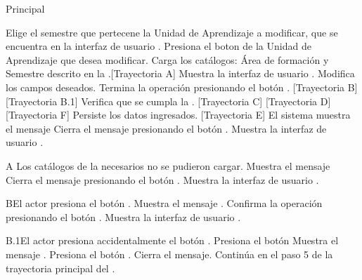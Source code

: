 \begin{UCtrayectoria}{Principal}
	
	\UCpaso[\UCactor] Elige el semestre que pertecene la Unidad de Aprendizaje a modificar, que se encuentra en la interfaz de usuario .
	\UCpaso[\UCactor] Presiona el boton  de la Unidad de Aprendizaje que desea modificar.
	\UCpaso Carga los catálogos: Área de formación y Semestre descrito en la .[Trayectoria A]
	\UCpaso Muestra la interfaz de usuario .
	\UCpaso[\UCactor] Modifica los campos deseados.
	\UCpaso[\UCactor] Termina la operación presionando el botón . [Trayectoria B] [Trayectoria B.1]
	\UCpaso Verifica que se cumpla la . [Trayectoria C] [Trayectoria D] [Trayectoria F]
	\UCpaso Persiste los datos ingresados. [Trayectoria E]
	\UCpaso El sistema muestra el mensaje   
	\UCpaso[\UCactor] Cierra el mensaje presionando el botón .
	\UCpaso Muestra la interfaz de usuario  .

  
\begin{UCtrayectoriaA}{A}{ Los catálogos de la  necesarios no se pudieron cargar.}
	\UCpaso Muestra el mensaje 
	\UCpaso[\UCactor] Cierra el mensaje presionando el botón .
	\UCpaso Muestra la interfaz de usuario .
\end{UCtrayectoriaA}

\begin{UCtrayectoriaA}{B}{El actor presiona el botón .}
	\UCpaso Muestra el mensaje .
	\UCpaso[\UCactor] Confirma la operación presionando el botón .
	\UCpaso Muestra la interfaz de usuario .
\end{UCtrayectoriaA}

\begin{UCtrayectoriaA}{B.1}{El actor presiona accidentalmente el botón .}
	\UCpaso[\UCactor] Presiona el botón 
	\UCpaso Muestra el mensaje .
	\UCpaso[\UCactor] Presiona el botón .
	\UCpaso Cierra el mensaje.
	\UCpaso Continúa en el paso 5 de la trayectoria principal del .
\end{UCtrayectoriaA}


\end{UCtrayectoria}
